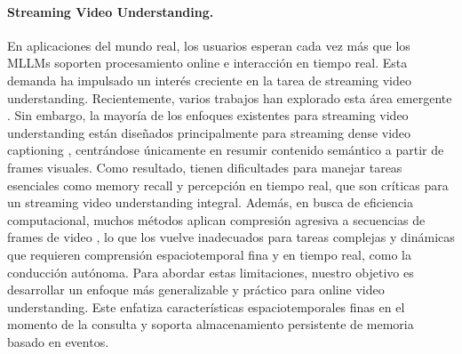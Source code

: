 \paragraph{Streaming Video Understanding.} En aplicaciones del mundo real, los usuarios esperan cada vez más que los MLLMs soporten procesamiento online e interacción en tiempo real. Esta demanda ha impulsado un interés creciente en la tarea de streaming video understanding. Recientemente, varios trabajos han explorado esta área emergente \cite{chen2024videollmonline,zhang2024flashvstream,yang2025svbench,di2025rekv,xiong2025streamchat,huang2024videochatonline}. Sin embargo, la mayoría de los enfoques existentes para streaming video understanding están diseñados principalmente para streaming dense video captioning \cite{chen2024videollmonline,wang2024mmduet,li2025lionfs,qian2025dispider,ding2025streammind}, centrándose únicamente en resumir contenido semántico a partir de frames visuales. Como resultado, tienen dificultades para manejar tareas esenciales como memory recall y percepción en tiempo real, que son críticas para un streaming video understanding integral. Además, en busca de eficiencia computacional, muchos métodos aplican compresión agresiva a secuencias de frames de video \cite{qian2024videostreaming, zhang2024internlmxco, yao2025timechatonline}, lo que los vuelve inadecuados para tareas complejas y dinámicas que requieren comprensión espaciotemporal fina y en tiempo real, como la conducción autónoma. Para abordar estas limitaciones, nuestro objetivo es desarrollar un enfoque más generalizable y práctico para online video understanding. Este enfatiza características espaciotemporales finas en el momento de la consulta y soporta almacenamiento persistente de memoria basado en eventos.

